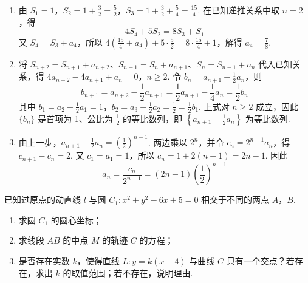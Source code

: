 \begin{solution}
\begin{enumerate}
\item 由 \(S_1=1\)，\(S_2=1+\frac32=\frac52\)，\(S_3=1+\frac32+\frac54=\frac{15}{4}\). 在已知递推关系中取 \(n=2\)，得
\[
4S_4+5S_2=8S_3+S_1
\]
又 \(S_4=S_3+a_4\)，所以 \(4\left(\frac{15}{4}+a_4\right)+5\cdot\frac52=8\cdot\frac{15}{4}+1\)，解得 \(a_4=\frac78\).

\item 将 \(S_{n+2}=S_{n+1}+a_{n+2}\)、\(S_{n+1}=S_n+a_{n+1}\)、\(S_n=S_{n-1}+a_n\) 代入已知关系，得
\(4a_{n+2}-4a_{n+1}+a_n=0\)，\(n\geqslant2\).
令 \(b_n=a_{n+1}-\frac12a_n\)，则
\[
b_{n+1}=a_{n+2}-\frac12a_{n+1}=\frac12a_{n+1}-\frac14a_n=\frac12b_n
\]
其中 \(b_1=a_2-\frac12a_1=1\)，\(b_2=a_3-\frac12a_2=\frac12=\frac12b_1\). 上式对 \(n\geqslant2\) 成立，因此 \(\{b_n\}\) 是首项为 1、公比为 \(\frac12\) 的等比数列，即 \(\left\{a_{n+1}-\frac12a_n\right\}\) 为等比数列.

\item 由上一步，\(a_{n+1}-\frac12a_n=\left(\frac12\right)^{n-1}\). 两边乘以 \(2^n\)，并令 \(c_n=2^{n-1}a_n\)，得 \(c_{n+1}-c_n=2\). 又 \(c_1=a_1=1\)，所以 \(c_n=1+2(n-1)=2n-1\). 因此
\[
a_n=\frac{c_n}{2^{n-1}}=(2n-1)\left(\frac12\right)^{n-1}
\]
\end{enumerate}
\end{solution}

\begin{problem}
已知过原点的动直线 \(l\) 与圆 \(C_1: x^2 + y^2 - 6x + 5 = 0\) 相交于不同的两点 \(A\)，\(B\).
\begin{enumerate}
\item 求圆 \(C_1\) 的圆心坐标；
\item 求线段 \(AB\) 的中点 \(M\) 的轨迹 \(C\) 的方程；
\item 是否存在实数 \(k\)，使得直线 \(L: y = k(x - 4)\) 与曲线 \(C\) 只有一个交点？若存在，求出 \(k\) 的取值范围；若不存在，说明理由.
\end{enumerate}
\end{problem}

